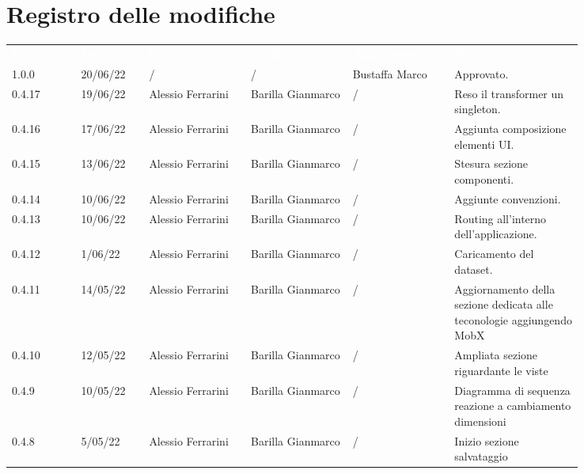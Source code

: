 \section*{Registro delle modifiche}

{\renewcommand{\arraystretch}{1.5}
\scriptsize
\begin{tabular}{p{0.10\linewidth}p{0.10\linewidth}p{0.15\linewidth}p{0.15\linewidth}p{0.15\linewidth}p{0.19\linewidth}}
	\rowcolor[RGB]{33, 73, 50}
	\textcolor{white}{\textbf{Versione}} & \textcolor{white}{\textbf{Data}} &
	\textcolor{white}{\textbf{Redattore}} & \textcolor{white}{\textbf{Verificatore}} &
	\textcolor{white}{\textbf{Approvatore}} & \textcolor{white}{\textbf{Descrizione}}\\
	
	\rowcolor[RGB]{216, 235, 171}
	1.0.0 & 20/06/22 & / & / & Bustaffa Marco & Approvato. \\
	\rowcolor[RGB]{233, 245, 206}
	0.4.17 & 19/06/22 & Alessio Ferrarini & Barilla Gianmarco & / & Reso il transformer un singleton.\\
	\rowcolor[RGB]{216, 235, 171}
	\rowcolor[RGB]{233, 245, 206}
	0.4.16 & 17/06/22 & Alessio Ferrarini & Barilla Gianmarco & / & Aggiunta composizione elementi UI.\\
	\rowcolor[RGB]{216, 235, 171}
	0.4.15 & 13/06/22 & Alessio Ferrarini & Barilla Gianmarco & / & Stesura sezione componenti. \\
	\rowcolor[RGB]{233, 245, 206}
	0.4.14 & 10/06/22 & Alessio Ferrarini & Barilla Gianmarco & / & Aggiunte convenzioni.\\
	\rowcolor[RGB]{216, 235, 171}
	0.4.13 & 10/06/22 & Alessio Ferrarini & Barilla Gianmarco & / & Routing all'interno dell'applicazione. \\
	\rowcolor[RGB]{233, 245, 206}
	0.4.12 & 1/06/22 & Alessio Ferrarini & Barilla Gianmarco & / & Caricamento del dataset.\\
	\rowcolor[RGB]{216, 235, 171}
	0.4.11 & 14/05/22 & Alessio Ferrarini & Barilla Gianmarco & / & Aggiornamento della sezione
  dedicata alle teconologie aggiungendo MobX \\
	\rowcolor[RGB]{233, 245, 206}
	0.4.10 & 12/05/22 & Alessio Ferrarini & Barilla Gianmarco & / & Ampliata sezione riguardante le
  viste \\
	\rowcolor[RGB]{216, 235, 171}
	0.4.9 & 10/05/22 & Alessio Ferrarini & Barilla Gianmarco & / & Diagramma di sequenza reazione
  a cambiamento dimensioni \\
	\rowcolor[RGB]{233, 245, 206}
	0.4.8 & 5/05/22 & Alessio Ferrarini & Barilla Gianmarco & / & Inizio sezione salvataggio

\end{tabular}}
